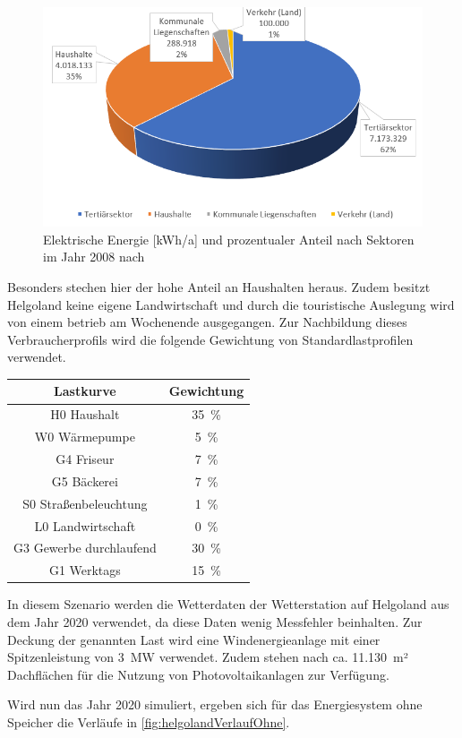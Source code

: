 \begin{figure}[H]
	\centering
	\includegraphics[width=0.6\linewidth]{Abbildungen/StromverbrauchHelgoland.png}
	\caption{Elektrische Energie [kWh/a] und prozentualer Anteil nach Sektoren im Jahr 2008 nach \cite{Helgoland}}
	\label{fig:helgolandVerbrauch}
\end{figure}

Besonders stechen hier der hohe Anteil an Haushalten heraus. Zudem besitzt Helgoland keine eigene Landwirtschaft und durch die touristische Auslegung wird von einem betrieb am Wochenende ausgegangen. Zur Nachbildung dieses Verbraucherprofils wird die folgende Gewichtung von Standardlastprofilen verwendet.

\begin{center}
	\begin{tabular}[htpb]{c|c}
		\textbf{Lastkurve} & \textbf{Gewichtung} \\
		\hline
		H0 Haushalt & 35~\% \\
		W0 Wärmepumpe & 5~\% \\
		G4 Friseur & 7~\% \\
		G5 Bäckerei & 7~\% \\
		S0 Straßenbeleuchtung & 1~\% \\
		L0 Landwirtschaft & 0~\% \\
		G3 Gewerbe durchlaufend & 30~\% \\
		G1 Werktags & 15~\% 
	\end{tabular}
\end{center}

In diesem Szenario werden die Wetterdaten der Wetterstation auf Helgoland aus dem Jahr 2020 verwendet, da diese Daten wenig Messfehler beinhalten. Zur Deckung der genannten Last wird eine Windenergieanlage mit einer Spitzenleistung von 3~MW verwendet. Zudem stehen nach \cite{Helgoland} ca. 11.130~m² Dachflächen für die Nutzung von Photovoltaikanlagen zur Verfügung. 

Wird nun das Jahr 2020 simuliert, ergeben sich für das Energiesystem ohne Speicher die Verläufe in \autoref{fig:helgolandVerlaufOhne}.

